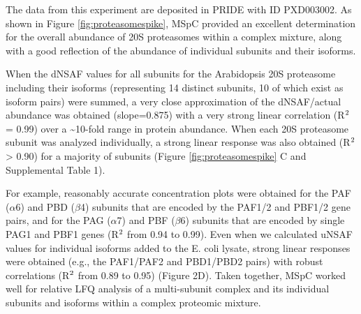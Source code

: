 The data from this experiment are deposited in PRIDE with ID PXD003002.
As shown in Figure \ref{fig:proteasomespike}, MSpC provided an excellent determination for the overall abundance of 20S proteasomes within a complex mixture, along with a good reflection of the abundance of individual subunits and their isoforms.

When the dNSAF values for all subunits for the Arabidopsis 20S proteasome including their isoforms (representing 14 distinct subunits, 10 of which exist as isoform pairs) were summed, a very close approximation of the dNSAF/actual abundance was obtained (slope=0.875) with a very strong linear correlation (R$\textsuperscript{2}$ = 0.99) over a \textasciitilde10-fold range in protein abundance.  
When each 20S proteasome subunit was analyzed individually, a strong linear response was also obtained (R$\textsuperscript{2}$ > 0.90) for a majority of subunits (Figure \ref{fig:proteasomespike} C and Supplemental Table 1).

For example, reasonably accurate concentration plots were obtained for the PAF ($\alpha$6) and PBD ($\beta$4) subunits that are encoded by the PAF1/2 and PBF1/2 gene pairs, and for the PAG ($\alpha$7) and PBF ($\beta$6) subunits that are encoded by single PAG1 and PBF1 genes (R$\textsuperscript{2}$  from 0.94 to 0.99).
Even when we calculated uNSAF values for individual isoforms added to the E. coli lysate, strong linear responses were obtained (e.g., the PAF1/PAF2 and PBD1/PBD2 pairs) with robust correlations (R$\textsuperscript{2}$ from 0.89 to 0.95) (Figure 2D).
Taken together, MSpC worked well for relative LFQ analysis of a multi-subunit complex and its individual subunits and isoforms within a complex proteomic mixture.

